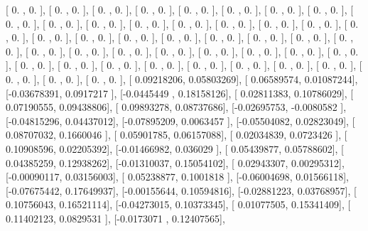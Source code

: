 \documentclass{article}
\begin{document}
       [ 0.        ,  0.        ],
       [ 0.        ,  0.        ],
       [ 0.        ,  0.        ],
       [ 0.        ,  0.        ],
       [ 0.        ,  0.        ],
       [ 0.        ,  0.        ],
       [ 0.        ,  0.        ],
       [ 0.        ,  0.        ],
       [ 0.        ,  0.        ],
       [ 0.        ,  0.        ],
       [ 0.        ,  0.        ],
       [ 0.        ,  0.        ],
       [ 0.        ,  0.        ],
       [ 0.        ,  0.        ],
       [ 0.        ,  0.        ],
       [ 0.        ,  0.        ],
       [ 0.        ,  0.        ],
       [ 0.        ,  0.        ],
       [ 0.        ,  0.        ],
       [ 0.        ,  0.        ],
       [ 0.        ,  0.        ],
       [ 0.        ,  0.        ],
       [ 0.        ,  0.        ],
       [ 0.        ,  0.        ],
       [ 0.        ,  0.        ],
       [ 0.        ,  0.        ],
       [ 0.        ,  0.        ],
       [ 0.        ,  0.        ],
       [ 0.        ,  0.        ],
       [ 0.        ,  0.        ],
       [ 0.        ,  0.        ],
       [ 0.        ,  0.        ],
       [ 0.        ,  0.        ],
       [ 0.        ,  0.        ],
       [ 0.        ,  0.        ],
       [ 0.        ,  0.        ],
       [ 0.        ,  0.        ],
       [ 0.        ,  0.        ],
       [ 0.        ,  0.        ],
       [ 0.        ,  0.        ],
       [ 0.        ,  0.        ],
       [ 0.        ,  0.        ],
       [ 0.        ,  0.        ],
       [ 0.        ,  0.        ],
       [ 0.09218206,  0.05803269],
       [ 0.06589574,  0.01087244],
       [-0.03678391,  0.0917217 ],
       [-0.0445449 ,  0.18158126],
       [ 0.02811383,  0.10786029],
       [ 0.07190555,  0.09438806],
       [ 0.09893278,  0.08737686],
       [-0.02695753, -0.0080582 ],
       [-0.04815296,  0.04437012],
       [-0.07895209,  0.0063457 ],
       [-0.05504082,  0.02823049],
       [ 0.08707032,  0.1660046 ],
       [ 0.05901785,  0.06157088],
       [ 0.02034839,  0.0723426 ],
       [ 0.10908596,  0.02205392],
       [-0.01466982,  0.036029  ],
       [ 0.05439877,  0.05788602],
       [ 0.04385259,  0.12938262],
       [-0.01310037,  0.15054102],
       [ 0.02943307,  0.00295312],
       [-0.00090117,  0.03156003],
       [ 0.05238877,  0.1001818 ],
       [-0.06004698,  0.01566118],
       [-0.07675442,  0.17649937],
       [-0.00155644,  0.10594816],
       [-0.02881223,  0.03768957],
       [ 0.10756043,  0.16521114],
       [-0.04273015,  0.10373345],
       [ 0.01077505,  0.15341409],
       [ 0.11402123,  0.0829531 ],
       [-0.0173071 ,  0.12407565],
\end{document}
